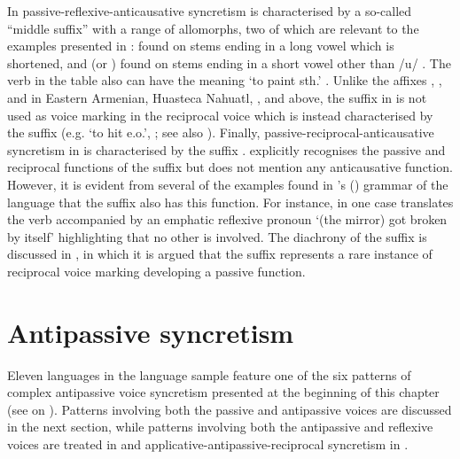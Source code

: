In  passive-reflexive-anticausative syncretism is characterised by a so-called “middle suffix” with a range of allomorphs, two of which are relevant to the examples presented in :  found on stems ending in a long vowel which is shortened, and  (or ) found on stems ending in a short vowel other than /u/ \citep[276f.]{evans:1995}. The verb  in the table also can have the meaning ‘to paint sth.’ \citep[726]{evans:1995}. Unlike the affixes , ,  and  in Eastern Armenian, Huasteca Nahuatl, , and  above, the suffix  in  is not used as voice marking in the reciprocal voice which is instead characterised by the suffix  (e.g.  ‘to hit e.o.’, \citealt[487]{evans:1995}; see also ). Finally, passive-reciprocal-anticausative syncretism in  is characterised by the suffix . \cite[333ff., 342ff.]{kawachi:2007} explicitly recognises the passive and reciprocal functions of the suffix but does not mention any anticausative function. However, it is evident from several of the examples found in \citeauthor{kawachi:2007}’s (\citeyear[e.g. 117]{kawachi:2007}) grammar of the language that the suffix also has this function. For instance, in one case \cite[186]{kawachi:2007} translates the verb  accompanied by an emphatic reflexive pronoun ‘(the mirror) got broken by itself’ highlighting that no other  is involved. The diachrony of the  suffix  is discussed in , in which it is argued that the suffix represents a rare instance of reciprocal voice marking developing a passive function.

\section{Antipassive syncretism} \label{sec:complex-syncretism:antipassive}
Eleven languages in the language sample feature one of the six patterns of complex antipassive voice syncretism presented at the beginning of this chapter (see  on \pageref{tab:ch5:complex-patterns}). Patterns involving both the passive and antipassive voices are discussed in the next section, while patterns involving both the antipassive and reflexive voices are treated in  and applicative-antipassive-reciprocal syncretism in .

